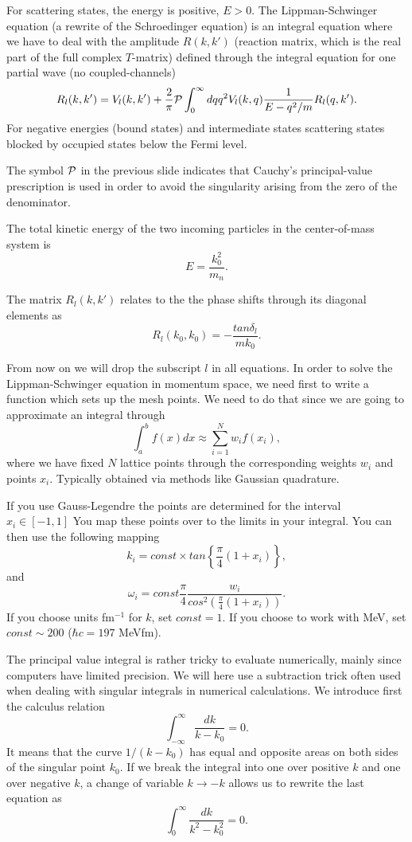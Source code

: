 \documentclass[graybox,sectrefs,envcountresetchap,open=right]{svmonodo}
\begin{document}
For scattering states, the energy is positive, $E>0$. 
The Lippman-Schwinger equation (a rewrite of the Schroedinger equation)
is an integral equation
where we have to deal with the amplitude 
$R(k,k')$ (reaction matrix, which is the real part of  the full
complex $T$-matrix)
defined through the integral equation for one partial wave (no coupled-channels) 
\begin{equation}
    R_l(k,k') = V_l(k,k') +\frac{2}{\pi}{\cal P}
                \int_0^{\infty}dqq^2V_l(k,q)\frac{1}{E-q^2/m}R_l(q,k').
   \label{eq:ls1}
\end{equation}
For negative energies (bound states) and intermediate states scattering states blocked
by  occupied states below the Fermi level.


The symbol ${\cal P}$ in the previous slide indicates that Cauchy's principal-value prescription
is used in order to avoid the singularity arising from the zero of the denominator.


The total kinetic energy of the two 
incoming particles in the center-of-mass system
is 
\[
    E=\frac{k_0^2}{m_n}.
\]



The matrix $R_l(k,k')$ relates to the 
the  phase shifts through its diagonal elements as
\begin{equation}
     R_l(k_0,k_0)=-\frac{tan\delta_l}{mk_0}.
     \label{eq:shifts}
\end{equation}


From now on we will drop the subscript $l$ in all equations.
In order to solve the Lippman-Schwinger equation 
in momentum space, we need first to write 
a function which sets up the mesh points. 
We need to do that since we are going to approximate an integral
through 
\[
   \int_a^bf(x)dx\approx\sum_{i=1}^Nw_if(x_i),
\]
where we have fixed $N$ lattice points through the corresponding weights
$w_i$ and points $x_i$. Typically obtained via methods like Gaussian quadrature.


If you use Gauss-Legendre the points are determined for the interval $x_i\in [-1,1]$
You map these points over to the limits in your integral. You can then
use the following mapping
\[
  k_i=const\times tan\left\{\frac{\pi}{4}(1+x_i)\right\},
\]
and 
\[
   \omega_i= const\frac{\pi}{4}\frac{w_i}{cos^2\left(\frac{\pi}{4}(1+x_i)\right)}.
\]
If you choose units fm$^{-1}$ for $k$, set $const=1$. If you choose to work
with MeV, set $const\sim 200$ ($\hbar c=197$ MeVfm).



The principal value integral is rather tricky
to evaluate numerically, mainly since computers have limited
precision. We will here use a subtraction trick often used
when dealing with singular integrals in numerical calculations.
We introduce first the calculus relation
\[
  \int_{-\infty}^{\infty} \frac{dk}{k-k_0} =0.
\]
It means that the curve $1/(k-k_0)$ has equal and opposite
areas on both sides of the singular point $k_0$. If we break
the integral into one over positive $k$ and one over 
negative $k$, a change of variable $k\rightarrow -k$ 
allows us to rewrite the last equation as
\[
  \int_{0}^{\infty} \frac{dk}{k^2-k_0^2} =0.
\]
\end{document}
